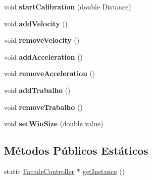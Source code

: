 \begin{DoxyCompactItemize}
\item 
\hypertarget{classcontroller_1_1FacadeController_a53e99e3218d60f10ecea65f84ca376b4}{
void {\bfseries startCalibration} (double Distance)}
\label{classcontroller_1_1FacadeController_a53e99e3218d60f10ecea65f84ca376b4}

\item 
\hypertarget{classcontroller_1_1FacadeController_a89ea7c34da8b0ec3395e0f6afe6ec830}{
void {\bfseries addVelocity} ()}
\label{classcontroller_1_1FacadeController_a89ea7c34da8b0ec3395e0f6afe6ec830}

\item 
\hypertarget{classcontroller_1_1FacadeController_ab04b2bc7c3bfa51bbbebb3ec3c156673}{
void {\bfseries removeVelocity} ()}
\label{classcontroller_1_1FacadeController_ab04b2bc7c3bfa51bbbebb3ec3c156673}

\item 
\hypertarget{classcontroller_1_1FacadeController_a0866aedc44238d01ce89d4606ef2c710}{
void {\bfseries addAcceleration} ()}
\label{classcontroller_1_1FacadeController_a0866aedc44238d01ce89d4606ef2c710}

\item 
\hypertarget{classcontroller_1_1FacadeController_a59cf57dc35bdb451c680b7a6a72ef10d}{
void {\bfseries removeAcceleration} ()}
\label{classcontroller_1_1FacadeController_a59cf57dc35bdb451c680b7a6a72ef10d}

\item 
\hypertarget{classcontroller_1_1FacadeController_af615ee47767dc5b7518940495f0ec3e6}{
void {\bfseries addTrabalho} ()}
\label{classcontroller_1_1FacadeController_af615ee47767dc5b7518940495f0ec3e6}

\item 
\hypertarget{classcontroller_1_1FacadeController_a4e45b69e2f39dc2191012d49d8061021}{
void {\bfseries removeTrabalho} ()}
\label{classcontroller_1_1FacadeController_a4e45b69e2f39dc2191012d49d8061021}

\item 
\hypertarget{classcontroller_1_1FacadeController_ad6cbc6f4b65e5d234bfbb9b56f97a2ea}{
void {\bfseries setWinSize} (double value)}
\label{classcontroller_1_1FacadeController_ad6cbc6f4b65e5d234bfbb9b56f97a2ea}

\end{DoxyCompactItemize}
\subsection*{Métodos Públicos Estáticos}
\begin{DoxyCompactItemize}
\item 
static \hyperlink{classcontroller_1_1FacadeController}{FacadeController} $\ast$ \hyperlink{classcontroller_1_1FacadeController_a08417d90d1b3acf44ec4b65f0e28aae4}{getInstance} ()
\end{DoxyCompactItemize}


